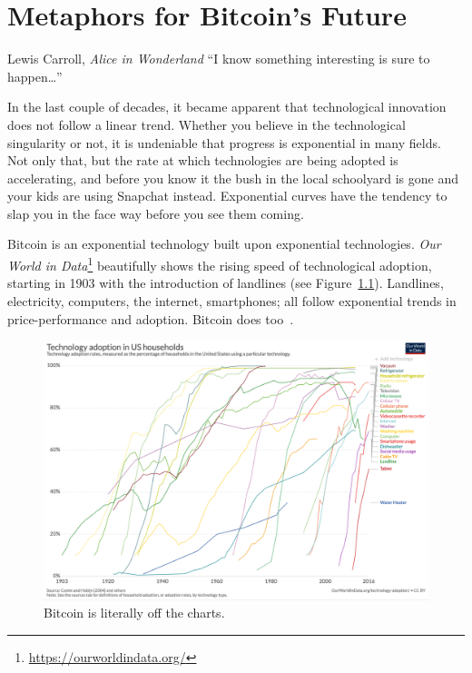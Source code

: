 \chapter{Metaphors for Bitcoin's Future}
\label{les:21}

\begin{chapquote}{Lewis Carroll, \textit{Alice in Wonderland}}
\enquote{I know something interesting is sure to happen\ldots}
\end{chapquote}

In the last couple of decades, it became apparent that technological
innovation does not follow a linear trend. Whether you believe in the
technological singularity or not, it is undeniable that progress is
exponential in many fields. Not only that, but the rate at which
technologies are being adopted is accelerating, and before you know it
the bush in the local schoolyard is gone and your kids are using
Snapchat instead. Exponential curves have the tendency to slap you in
the face way before you see them coming.

Bitcoin is an exponential technology built upon exponential technologies.
\textit{Our World in Data}\footnote{\url{https://ourworldindata.org/}}
beautifully shows the rising speed of technological adoption, starting in 1903
with the introduction of landlines (see Figure~\ref{fig:tech-adoption}).
Landlines, electricity, computers, the internet, smartphones; all follow
exponential trends in price-performance and adoption. Bitcoin does
too~\cite{tech-adoption}.

\begin{figure}
  \includegraphics{assets/images/tech-adoption.png}
  \caption{Bitcoin is literally off the charts.}
  \label{fig:tech-adoption}
\end{figure}

